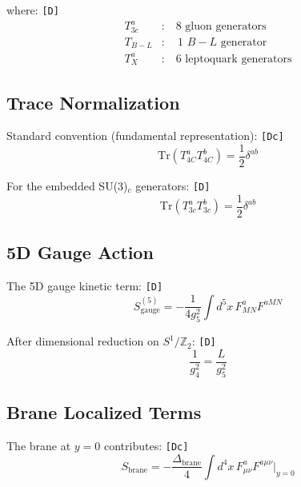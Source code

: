 \documentclass[11pt,a4paper]{article}
\newcommand{\tagD}{\textcolor{green!50!black}{\texttt{[D]}}}
\newcommand{\tagDc}{\textcolor{blue!70!black}{\texttt{[Dc]}}}
\theoremstyle{definition}
\begin{document}
where: \tagD{}
\begin{align}
\label{eq:gen-gluon}
T^a_{3c} &: \quad \text{8 gluon generators} \\
\label{eq:gen-bl}
T_{B-L} &: \quad \text{1 } B-L \text{ generator} \\
\label{eq:gen-lq}
T^a_X &: \quad \text{6 leptoquark generators}
\end{align}

\subsection{Trace Normalization}
\label{subsec:trace-norm}

Standard convention (fundamental representation): \tagDc{}
\begin{equation}
\label{eq:trace-su4}
\text{Tr}(T^a_{4C} T^b_{4C}) = \frac{1}{2} \delta^{ab}
\end{equation}

For the embedded SU(3)$_c$ generators: \tagD{}
\begin{equation}
\label{eq:trace-su3}
\text{Tr}(T^a_{3c} T^b_{3c}) = \frac{1}{2} \delta^{ab}
\end{equation}

\subsection{5D Gauge Action}
\label{subsec:5d-action}

The 5D gauge kinetic term: \tagD{}
\begin{equation}
\label{eq:5d-gauge-action}
S_{\text{gauge}}^{(5)} = -\frac{1}{4g_5^2} \int d^5x \, F_{MN}^a F^{aMN}
\end{equation}

After dimensional reduction on $S^1/\mathbb{Z}_2$: \tagD{}
\begin{equation}
\label{eq:4d-reduction}
\frac{1}{g_4^2} = \frac{L}{g_5^2}
\end{equation}

\subsection{Brane Localized Terms}
\label{subsec:brane-terms}

The brane at $y = 0$ contributes: \tagDc{}
\begin{equation}
\label{eq:brane-kinetic}
S_{\text{brane}} = -\frac{\Delta_{\text{brane}}}{4} \int d^4x \, F_{\mu\nu}^a F^{a\mu\nu} \bigg|_{y=0}
\end{equation}
\end{document}
